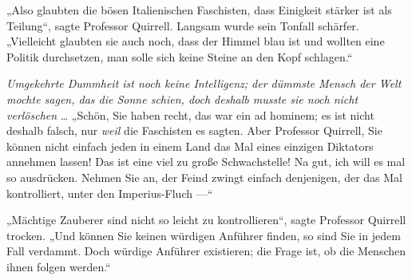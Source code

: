 „Also glaubten die bösen Italienischen Faschisten, dass Einigkeit stärker ist als Teilung“, sagte Professor Quirrell. Langsam wurde sein Tonfall schärfer.
„Vielleicht glaubten sie auch noch, dass der Himmel blau ist und wollten eine Politik durchsetzen, man solle sich keine Steine an den Kopf schlagen.“

\emph{Umgekehrte Dummheit ist noch keine Intelligenz; der dümmste Mensch der Welt mochte sagen, das die Sonne schien, doch deshalb musste sie noch nicht verlöschen} … %
„Schön, Sie haben recht, das war ein ad hominem; es ist nicht deshalb falsch, nur \emph{weil} die Faschisten es sagten. Aber Professor Quirrell, Sie können nicht einfach jeden in einem Land das Mal eines einzigen Diktators annehmen lassen! Das ist eine viel zu große Schwachstelle!%
Na gut, ich will es mal so ausdrücken. Nehmen Sie an, der Feind zwingt einfach denjenigen, der das Mal kontrolliert, unter den Imperius-Fluch —“

„Mächtige Zauberer sind nicht so leicht zu kontrollieren“, sagte Professor Quirrell trocken.
„Und können Sie keinen würdigen Anführer finden, so sind Sie in jedem Fall verdammt. Doch würdige Anführer existieren; die Frage ist, ob die Menschen ihnen folgen werden.“

